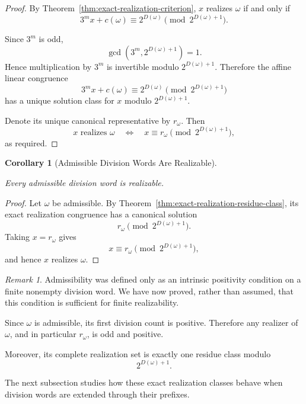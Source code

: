 \documentclass[12pt, oneside]{article}
\numberwithin{equation}{section}
\theoremstyle{definition}
\theoremstyle{plain}
\newtheorem{corollary}[theorem]{Corollary}
\theoremstyle{remark}
\newtheorem*{remark}{Remark}
\begin{document}
\begin{proof}
By Theorem~\ref{thm:exact-realization-criterion}, \(x\) realizes
\(\omega\) if and only if
\[
3^m x+c(\omega)
\equiv
2^{D(\omega)}
\pmod{2^{D(\omega)+1}}.
\]

Since \(3^m\) is odd,
\[
\gcd\!\left(3^m,2^{D(\omega)+1}\right)=1.
\]
Hence multiplication by \(3^m\) is invertible modulo
\(2^{D(\omega)+1}\). Therefore the affine linear congruence
\[
3^m x+c(\omega)
\equiv
2^{D(\omega)}
\pmod{2^{D(\omega)+1}}
\]
has a unique solution class for \(x\) modulo \(2^{D(\omega)+1}\).

Denote its unique canonical representative by \(r_\omega\). Then
\[
x\text{ realizes }\omega
\quad\Longleftrightarrow\quad
x\equiv r_\omega
\pmod{2^{D(\omega)+1}},
\]
as required.
\end{proof}

\begin{corollary}[Admissible Division Words Are Realizable]
\label{cor:admissible-words-realizable}

Every admissible division word is realizable.
\end{corollary}

\begin{proof}
Let \(\omega\) be admissible. By
Theorem~\ref{thm:exact-realization-residue-class}, its exact realization
congruence has a canonical solution
\[
r_\omega
\pmod{2^{D(\omega)+1}}.
\]
Taking \(x=r_\omega\) gives
\[
x\equiv r_\omega
\pmod{2^{D(\omega)+1}},
\]
and hence \(x\) realizes \(\omega\).
\end{proof}

\begin{remark}
Admissibility was defined only as an intrinsic positivity condition on a
finite nonempty division word. We have now proved, rather than assumed,
that this condition is sufficient for finite realizability.

Since \(\omega\) is admissible, its first division count is positive.
Therefore any realizer of \(\omega\), and in particular \(r_\omega\), is
odd and positive.

\begin{center}
\end{center}

Moreover, its complete realization set is exactly one residue class
modulo
\[
2^{D(\omega)+1}.
\]

The next subsection studies how these exact realization classes behave when
division words are extended through their prefixes.
\end{remark}
\end{document}
